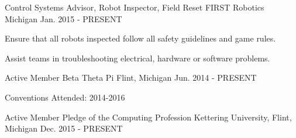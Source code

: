 

\begin{cventries}


  \cventry
    {Control Systems Advisor, Robot Inspector, Field Reset} %
    {FIRST Robotics} %
    {Michigan} %
    {Jan. 2015 - PRESENT} %
    {
      \begin{cvitems} %
        \item {Ensure that all robots inspected follow all safety guidelines and game rules.}
        \item {Assist teams in troubleshooting electrical, hardware or software problems.}
      \end{cvitems}
    }

  \cventry
    {Active Member} %
    {Beta Theta Pi} %
    {Flint, Michigan} %
    {Jun. 2014 - PRESENT} %
    {
      \begin{cvitems} %
        \item {Conventions Attended: 2014-2016}
      \end{cvitems}
    }

  \cventry
    {Active Member} %
    {Pledge of the Computing Profession} %
    {Kettering University, Flint, Michigan} %
    {Dec. 2015 - PRESENT} %
    {
      \begin{cvitems} %
      \end{cvitems}
    }


\end{cventries}
